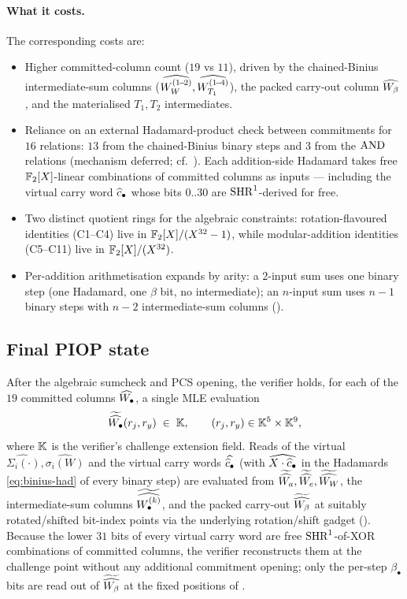 \paragraph{What it costs.}
The corresponding costs are:
\begin{itemize}[leftmargin=2em,topsep=2pt]
  \item Higher committed-column count ($19$ vs $11$), driven by the
        chained-Binius intermediate-sum columns
        ($\widehat{W_W^{(1\!-\!2)}}, \widehat{W_{T_1}^{(1\!-\!4)}}$), the
        packed carry-out column $\widehat{W_\beta}$, and the materialised
        $T_1, T_2$ intermediates.
  \item Reliance on an external Hadamard-product check between
        commitments for $16$ relations: $13$ from the chained-Binius
        binary steps and $3$ from the $\operatorname{AND}$ relations (mechanism
        deferred; cf.\ ). Each addition-side
        Hadamard takes free $\mathbb{F}_2[X]$-linear combinations of
        committed columns as inputs — including the virtual carry
        word $\widehat{c}_\bullet$ whose bits $0..30$ are
        $\operatorname{SHR}^{1}$-derived for free.
  \item Two distinct quotient rings for the algebraic constraints:
        rotation-flavoured identities (C1--C4) live in $\mathbb{F}_2[X]/(X^{32}-1)$, while
        modular-addition identities (C5--C11) live in $\mathbb{F}_2[X]/(X^{32})$.
  \item Per-addition arithmetisation expands by arity: a $2$-input
        sum uses one binary step (one Hadamard, one $\beta$ bit, no
        intermediate); an $n$-input sum uses $n - 1$ binary steps
        with $n - 2$ intermediate-sum columns
        ().
\end{itemize}

\subsection{Final PIOP state}

After the algebraic sumcheck and PCS opening, the verifier holds, for
each of the $19$ committed columns $\widehat{W_\bullet}$, a single MLE
evaluation
\[
\widetilde{\widehat{W_\bullet}}(r_j, r_y) \;\in\; \mathbb{K}, \qquad
(r_j, r_y) \in \mathbb{K}^{5} \times \mathbb{K}^{9},
\]
where $\mathbb{K}$ is the verifier's challenge extension field. Reads of the
virtual $\widehat{\Sigma_i(\cdot)}, \widehat{\sigma_i(W)}$ and the
virtual carry words $\widehat{\widehat{c}_\bullet}$ (with
$\widehat{X \cdot \widehat{c}_\bullet}$ in the Hadamards
\eqref{eq:binius-had} of every binary step) are evaluated from
$\widetilde{\widehat{W_a}}, \widetilde{\widehat{W_e}},
\widetilde{\widehat{W_W}}$, the intermediate-sum columns
$\widetilde{\widehat{W_\bullet^{(k)}}}$, and the packed carry-out
$\widetilde{\widehat{W_\beta}}$ at suitably rotated/shifted bit-index
points via the underlying rotation/shift gadget
(). Because the lower $31$ bits of every
virtual carry word are free $\operatorname{SHR}^{1}$-of-XOR combinations of
committed columns, the verifier reconstructs them at the challenge
point without any additional commitment opening; only the per-step
$\beta_\bullet$ bits are read out of $\widetilde{\widehat{W_\beta}}$ at
the fixed positions of .

